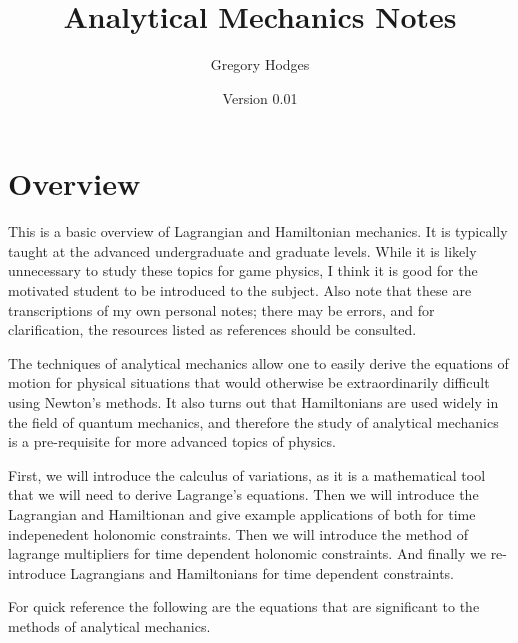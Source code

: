 \documentclass{article}
\begin{document}
\title{Analytical Mechanics Notes}
\author{Gregory Hodges}%
\date{Version 0.01}
\maketitle



%
%

\tableofcontents

%
%
\newpage
\section{Overview}

This is a basic overview of Lagrangian and Hamiltonian mechanics.  It is typically taught at the advanced undergraduate and graduate levels.  While it is likely unnecessary to study these topics for game physics, I think it is good for the motivated student to be introduced to the subject.  Also note that these are transcriptions of my own personal notes; there may be errors, and for clarification, the resources listed as references should be consulted.

The techniques of analytical mechanics allow one to easily derive the equations of motion for physical situations that would otherwise be extraordinarily difficult using Newton's methods.  It also turns out that Hamiltonians are used widely in the field of quantum mechanics, and therefore the study of analytical mechanics is a pre-requisite for more advanced topics of physics.

First, we will introduce the calculus of variations, as it is a mathematical tool that we will need to derive Lagrange's equations.  Then we will introduce the Lagrangian and Hamiltionan and give example applications of both for time indepenedent holonomic constraints.  Then we will introduce the method of lagrange multipliers for time dependent holonomic constraints.  And finally we re-introduce Lagrangians and Hamiltonians for time dependent constraints.

For quick reference the following are the equations that are significant to the methods of analytical mechanics.
\end{document}

